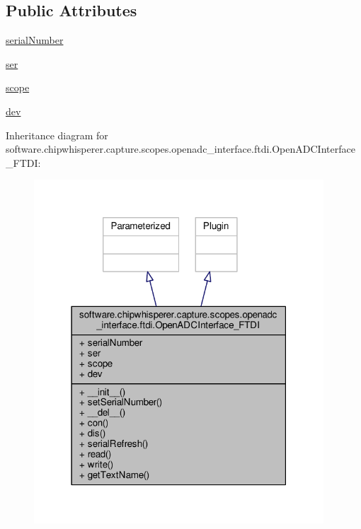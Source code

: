 \subsection*{Public Attributes}
\begin{DoxyCompactItemize}
\item 
\hyperlink{classsoftware_1_1chipwhisperer_1_1capture_1_1scopes_1_1openadc__interface_1_1ftdi_1_1OpenADCInterface__FTDI_a703c707f97f83493e3583976a2e98626}{serial\+Number}
\item 
\hyperlink{classsoftware_1_1chipwhisperer_1_1capture_1_1scopes_1_1openadc__interface_1_1ftdi_1_1OpenADCInterface__FTDI_a14615b617be61435968dcad225f44c35}{ser}
\item 
\hyperlink{classsoftware_1_1chipwhisperer_1_1capture_1_1scopes_1_1openadc__interface_1_1ftdi_1_1OpenADCInterface__FTDI_a1839c3323a244bfa90fbebdbedb9de1b}{scope}
\item 
\hyperlink{classsoftware_1_1chipwhisperer_1_1capture_1_1scopes_1_1openadc__interface_1_1ftdi_1_1OpenADCInterface__FTDI_ae61ba799973f7e7683e4a9d22edabe92}{dev}
\end{DoxyCompactItemize}


Inheritance diagram for software.\+chipwhisperer.\+capture.\+scopes.\+openadc\+\_\+interface.\+ftdi.\+Open\+A\+D\+C\+Interface\+\_\+\+F\+T\+D\+I\+:\nopagebreak
\begin{figure}[H]
\begin{center}
\leavevmode
\includegraphics[width=307pt]{d6/d30/classsoftware_1_1chipwhisperer_1_1capture_1_1scopes_1_1openadc__interface_1_1ftdi_1_1OpenADCInterface__FTDI__inherit__graph}
\end{center}
\end{figure}


